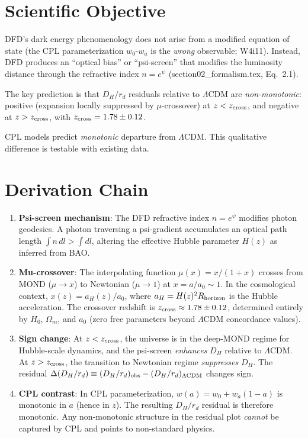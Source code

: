 \documentclass[11pt]{article}
\newcommand{\LCDM}{\Lambda\text{CDM}}
\begin{document}
\section{Scientific Objective}

DFD's dark energy phenomenology does not arise from a modified equation
of state (the CPL parameterization $w_0$-$w_a$ is the \emph{wrong}
observable; W4i11). Instead, DFD produces an ``optical bias'' or
``psi-screen'' that modifies the luminosity distance through the
refractive index $n = e^\psi$ (section02\_formalism.tex, Eq.~2.1).

The key prediction is that $D_H/r_d$ residuals relative to $\LCDM$ are
\emph{non-monotonic}: positive (expansion locally suppressed by
$\mu$-crossover) at $z < z_{\rm cross}$, and negative at $z > z_{\rm cross}$,
with $z_{\rm cross} = 1.78 \pm 0.12$.

CPL models predict \emph{monotonic} departure from $\LCDM$. This
qualitative difference is testable with existing data.

\section{Derivation Chain}

\begin{enumerate}
\item \textbf{Psi-screen mechanism}: The DFD refractive index $n = e^\psi$
  modifies photon geodesics. A photon traversing a psi-gradient
  accumulates an optical path length $\int n\,dl > \int dl$, altering
  the effective Hubble parameter $H(z)$ as inferred from BAO.

\item \textbf{Mu-crossover}: The interpolating function $\mu(x) = x/(1+x)$
  crosses from MOND ($\mu \to x$) to Newtonian ($\mu \to 1$) at
  $x = a/a_0 \sim 1$. In the cosmological context, $x(z) = a_H(z)/a_0$,
  where $a_H = H(z)^2 R_{\rm horizon}$ is the Hubble acceleration.
  The crossover redshift is $z_{\rm cross} \approx 1.78 \pm 0.12$,
  determined entirely by $H_0$, $\Omega_m$, and $a_0$ (zero free
  parameters beyond $\LCDM$ concordance values).

\item \textbf{Sign change}: At $z < z_{\rm cross}$, the universe is in
  the deep-MOND regime for Hubble-scale dynamics, and the psi-screen
  \emph{enhances} $D_H$ relative to $\LCDM$. At $z > z_{\rm cross}$,
  the transition to Newtonian regime \emph{suppresses} $D_H$. The
  residual $\Delta(D_H/r_d) \equiv (D_H/r_d)_{\rm obs} -
  (D_H/r_d)_{\LCDM}$ changes sign.

\item \textbf{CPL contrast}: In CPL parameterization, $w(a) = w_0 + w_a(1-a)$
  is monotonic in $a$ (hence in $z$). The resulting $D_H/r_d$ residual is
  therefore monotonic. Any non-monotonic structure in the residual plot
  \emph{cannot} be captured by CPL and points to non-standard physics.
\end{enumerate}
\end{document}
